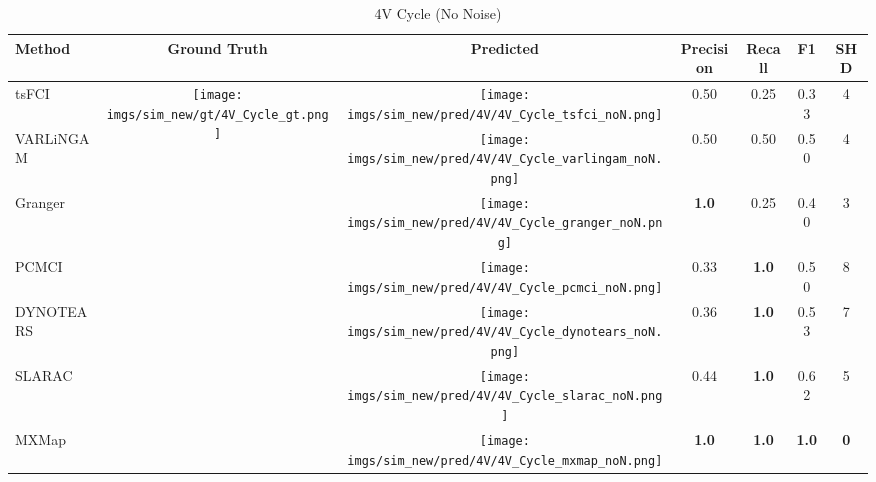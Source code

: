 \begin{table}[htb]
\begin{tabular}{l|c|c|c|c|c|c}
Method    & Ground Truth      & Predicted & Precision    & Recall       & F1           & SHD        \\ \hline
tsFCI     & \multirow{7}{*}[-4.6em]{\begin{minipage}{.17\linewidth} \centering \texttt{[image: imgs/sim\_new/gt/4V\_Cycle\_gt.png]} \end{minipage}} & \begin{minipage}{.17\linewidth} \centering \texttt{[image: imgs/sim\_new/pred/4V/4V\_Cycle\_tsfci\_noN.png]} \end{minipage}    & 0.50         & 0.25         & 0.33         & 4          \\
VARLiNGAM &                   & \begin{minipage}{.17\linewidth} \centering \texttt{[image: imgs/sim\_new/pred/4V/4V\_Cycle\_varlingam\_noN.png]} \end{minipage}  & 0.50         & 0.50         & 0.50         & 4          \\
Granger   &                   & \begin{minipage}{.17\linewidth} \centering \texttt{[image: imgs/sim\_new/pred/4V/4V\_Cycle\_granger\_noN.png]} \end{minipage}  & \textbf{1.0} & 0.25         & 0.40         & 3          \\
PCMCI     &                   & \begin{minipage}{.17\linewidth} \centering \texttt{[image: imgs/sim\_new/pred/4V/4V\_Cycle\_pcmci\_noN.png]} \end{minipage}  & 0.33         & \textbf{1.0} & 0.50         & 8          \\
DYNOTEARS &                   & \begin{minipage}{.17\linewidth} \centering \texttt{[image: imgs/sim\_new/pred/4V/4V\_Cycle\_dynotears\_noN.png]} \end{minipage}  & 0.36         & \textbf{1.0} & 0.53         & 7          \\
SLARAC    &                   & \begin{minipage}{.17\linewidth} \centering \texttt{[image: imgs/sim\_new/pred/4V/4V\_Cycle\_slarac\_noN.png]} \end{minipage}   & 0.44         & \textbf{1.0} & 0.62         & 5          \\ \cline{1-1} \cline{3-7} 
MXMap     &                   & \begin{minipage}{.17\linewidth} \centering \texttt{[image: imgs/sim\_new/pred/4V/4V\_Cycle\_mxmap\_noN.png]} \end{minipage}  & \textbf{1.0} & \textbf{1.0} & \textbf{1.0} & \textbf{0}
\end{tabular}
\caption{4V Cycle (No Noise)}
\label{tab:4V_Cycle_noN}
\end{table}

